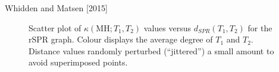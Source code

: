 \documentclass{beamer}
\theoremstyle{example}
\begin{document}
\begin{frame}{Whidden and Matsen [2015]}
\begin{figure}
    \caption{\small Scatter plot of $\kappa(\mathrm{MH}; T_1,T_2)$ values versus $d_{SPR}(T_1,T_2)$ for the rSPR graph. Colour displays the average degree of $T_1$ and $T_2$. Distance values randomly perturbed (``jittered'') a small amount to avoid superimposed points.}
\end{figure}
\end{frame}
\end{document}
